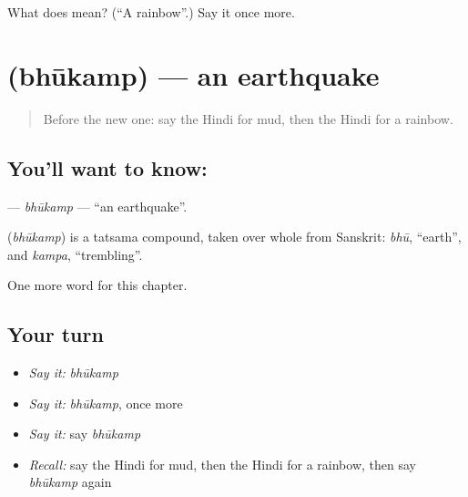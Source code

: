 \begin{tcolorbox}[breakable,colback=teal!4,colframe=teal!35!black,title={Before you move on}]
What does  mean? (\textquotedblleft{}A rainbow\textquotedblright{}.) Say it once more.
\end{tcolorbox}
\section[\texorpdfstring{\hi{भूकंप} (bhūkamp)}{भूकंप (bhūkamp)}]{ (bhūkamp) — an earthquake}

\label{lesson:HI-C253-bhukamp}



\begin{quote}
Before the new one: say the Hindi for mud, then the Hindi for a rainbow.
\end{quote}

\subsection*{You'll want to know: }
\textbf{} — \emph{bhūkamp} — \textquotedblleft{}an earthquake\textquotedblright{}.

\begin{cousinweb}
\textbf{} (\emph{bhūkamp}) is a tatsama compound, taken over whole from Sanskrit: \emph{bhū}, \textquotedblleft{}earth\textquotedblright{}, and \emph{kampa}, \textquotedblleft{}trembling\textquotedblright{}.
\end{cousinweb}

\begin{grammarlens}[title={What you've built}]
One more word for this chapter.
\end{grammarlens}

\subsection*{Your turn}
\begin{itemize}
\raggedright
  \item \emph{Say it:} \emph{bhūkamp}
  \item \emph{Say it:} \emph{bhūkamp}, once more
  \item \emph{Say it:} say \emph{bhūkamp}
  \item \emph{Recall:} say the Hindi for mud, then the Hindi for a rainbow, then say \emph{bhūkamp} again
\end{itemize}

